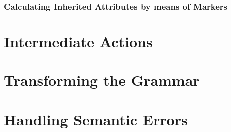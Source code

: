 \subsubsection{Calculating Inherited Attributes by means of Markers}

\section{Intermediate Actions}

\section{Transforming the Grammar}

\section{Handling Semantic Errors}